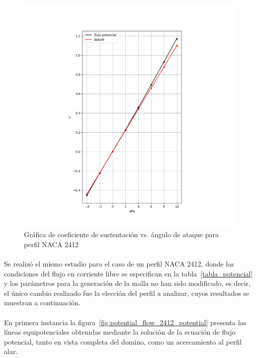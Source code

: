 \documentclass[letterpaper, openright, 12pt]{book}
\begin{document}
    \begin{figure}[H]%
        \centering
        \includegraphics[keepaspectratio,
            width=138mm]{./Imagenes/potential_flow_cl}
        \caption{Gráfica de coeficiente de sustentación vs. ángulo de ataque para
            perfil NACA 2412}
        \label{fig:potential_flow_cl}
    \end{figure}

    \paragraph*{}
    Se realizó el mismo estudio para el caso de un perfil NACA 2412, donde las
    condiciones del flujo en corriente libre se especifican en la
    tabla~\ref{tabla_potencial} y los parámetros para la generación de la malla
    no han sido modificado, es decir, el único cambio realizado fue la
    elección del perfil a analizar, cuyos resultados se muestran a
    continuación.

    \paragraph*{}
    En primera instancia la figura~\ref{fig:potential_flow_2412_potential}
    presenta las líneas equipotenciales obtenidas mediante la solución de la
    ecuación de flujo potencial, tanto en vista completa del domino, como un
    acercamiento al perfil alar.
\end{document}
